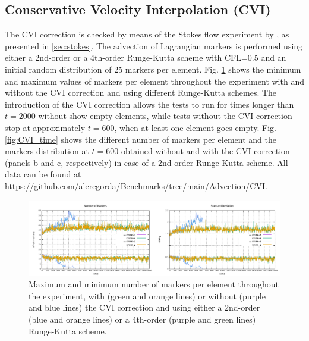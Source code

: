 \subsection{Conservative Velocity Interpolation (CVI)}\label{sec:CVI}
The CVI correction is checked by means of the Stokes flow experiment by \citet{Donea2003}, as presented in \ref{sec:stokes}. The advection of Lagrangian
markers is performed using either a 2nd-order or a 4th-order Runge-Kutta scheme with CFL=0.5 and an initial random distribution of 25 markers per element.
Fig. \ref{fig:CVI} shows the minimum and maximum values of markers per element throughout the experiment with and without the CVI correction and using
different Runge-Kutta schemes.
The introduction of the CVI correction allows the
tests to run for times longer than $t=2000$ without show empty elements, while tests without the CVI correction stop at approximately $t=600$, when at least
one element goes empty. Fig. \ref{fig:CVI_time} shows the different number of markers per element and the markers distribution at $t=600$ obtained without and
with the CVI correction (panels b and c, respectively) in case of a 2nd-order Runge-Kutta scheme. All data can be found at
\url{https://github.com/aleregorda/Benchmarks/tree/main/Advection/CVI}.
\begin{figure}[h!]
\centering
\includegraphics[width=13.5cm]{./Figures/CVI.pdf}
\caption{Maximum and minimum number of markers per element throughout the experiment, with (green and orange lines) or without (purple and blue lines)
the CVI correction and using either a 2nd-order (blue and orange lines) or a 4th-order (purple and green lines) Runge-Kutta scheme.}
\label{fig:CVI}
\end{figure}
